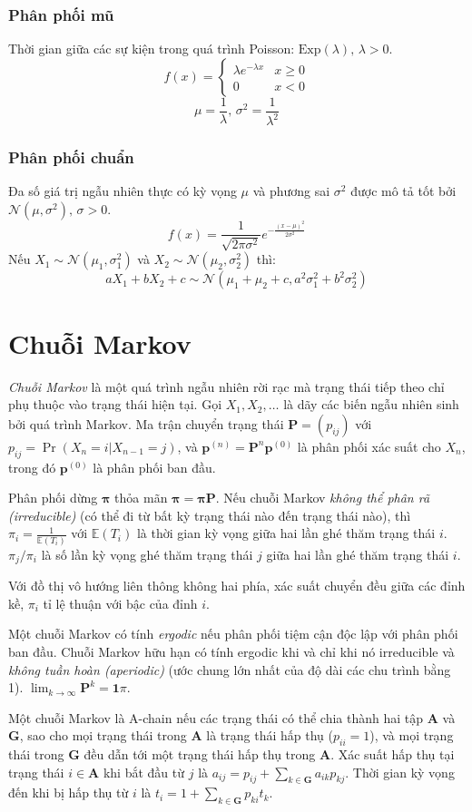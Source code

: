\subsubsection{Phân phối mũ}
Thời gian giữa các sự kiện trong quá trình Poisson: $\textrm{Exp}(\lambda),\,\lambda>0$.
\[f(x) = \left\{
\begin{array}{cl}
\lambda e^{-\lambda x} & x\geq0\\
0 & x<0
\end{array}\right.\]
\[\mu=\frac{1}{\lambda},\,\sigma^2=\frac{1}{\lambda^2}\]

\subsubsection{Phân phối chuẩn}
Đa số giá trị ngẫu nhiên thực có kỳ vọng $\mu$ và phương sai $\sigma^2$ được mô tả tốt bởi $\mathcal{N}(\mu,\sigma^2),\,\sigma>0$.
\[ f(x) = \frac{1}{\sqrt{2\pi\sigma^2}}e^{-\frac{(x-\mu)^2}{2\sigma^2}} \]
Nếu $X_1 \sim \mathcal{N}(\mu_1,\sigma_1^2)$ và $X_2 \sim \mathcal{N}(\mu_2,\sigma_2^2)$ thì:
\[ aX_1 + bX_2 + c \sim \mathcal{N}(\mu_1+\mu_2+c,a^2\sigma_1^2+b^2\sigma_2^2) \]

\section{Chuỗi Markov}
\emph{Chuỗi Markov} là một quá trình ngẫu nhiên rời rạc mà trạng thái tiếp theo chỉ phụ thuộc vào trạng thái hiện tại.
Gọi $X_1,X_2,\ldots$ là dãy các biến ngẫu nhiên sinh bởi quá trình Markov.
Ma trận chuyển trạng thái $\mathbf{P} = (p_{ij})$ với $p_{ij} = \Pr(X_n = i | X_{n-1} = j)$,
và $\mathbf{p}^{(n)} = \mathbf P^n \mathbf p^{(0)}$ là phân phối xác suất cho $X_n$,
trong đó $\mathbf{p}^{(0)}$ là phân phối ban đầu.

Phân phối dừng $\mathbf{\pi}$ thỏa mãn $\mathbf{\pi} = \mathbf{\pi P}$.
Nếu chuỗi Markov \emph{không thể phân rã (irreducible)} (có thể đi từ bất kỳ trạng thái nào đến trạng thái nào),
thì $\pi_i = \frac{1}{\mathbb{E}(T_i)}$ với $\mathbb{E}(T_i)$ là thời gian kỳ vọng giữa hai lần ghé thăm trạng thái $i$.
$\pi_j/\pi_i$ là số lần kỳ vọng ghé thăm trạng thái $j$ giữa hai lần ghé thăm trạng thái $i$.

Với đồ thị vô hướng liên thông không hai phía, xác suất chuyển đều giữa các đỉnh kề, $\pi_i$ tỉ lệ thuận với bậc của đỉnh $i$.

Một chuỗi Markov có tính \emph{ergodic} nếu phân phối tiệm cận độc lập với phân phối ban đầu.
Chuỗi Markov hữu hạn có tính ergodic khi và chỉ khi nó irreducible và \emph{không tuần hoàn (aperiodic)} (ước chung lớn nhất của độ dài các chu trình bằng 1).
$\lim_{k\rightarrow\infty}\mathbf{P}^k = \mathbf{1}\pi$.

Một chuỗi Markov là A-chain nếu các trạng thái có thể chia thành hai tập $\mathbf{A}$ và $\mathbf{G}$, sao cho mọi trạng thái trong $\mathbf{A}$ là trạng thái hấp thụ ($p_{ii}=1$), và mọi trạng thái trong $\mathbf{G}$ đều dẫn tới một trạng thái hấp thụ trong $\mathbf{A}$.
Xác suất hấp thụ tại trạng thái $i\in\mathbf{A}$ khi bắt đầu từ $j$ là $a_{ij} = p_{ij}+\sum_{k\in\mathbf{G}} a_{ik}p_{kj}$.
Thời gian kỳ vọng đến khi bị hấp thụ từ $i$ là $t_i = 1+\sum_{k\in\mathbf{G}}p_{ki}t_k$.
